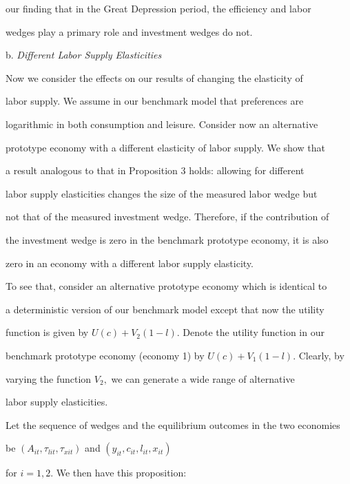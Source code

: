 \documentclass[fleqn,leqno,11pt]{article}
\begin{document}
our finding that in the Great Depression period, the efficiency and labor

wedges play a primary role and investment wedges do not.



\bigskip



\noindent b. \emph{Different Labor Supply Elasticities}



Now we consider the effects on our results of changing the elasticity of

labor supply. We assume in our benchmark model that preferences are

logarithmic in both consumption and leisure. Consider now an alternative

prototype economy with a different elasticity of labor supply. We show that

a result analogous to that in Proposition 3 holds: allowing for different

labor supply elasticities changes the size of the measured labor wedge but

not that of the measured investment wedge. Therefore, if the contribution of

the investment wedge is zero in the benchmark prototype economy, it is also

zero in an economy with a different labor supply elasticity.



To see that, consider an alternative prototype economy which is identical to

a deterministic version of our benchmark model except that now the utility

function is given by $U(c)+V_{2}(1-l)$. Denote the utility function in our

benchmark prototype economy (economy 1) by $U(c)+V_{1}(1-l).$ Clearly, by

varying the function $V_{2},$ we can generate a wide range of alternative

labor supply elasticities.



Let the sequence of wedges and the equilibrium outcomes in the two economies

be $(A_{it},\tau _{lit},\tau _{xit})$ and $(y_{it},c_{it},l_{it},x_{it})$

for $i=1,2.$ We then have this proposition:
\end{document}
